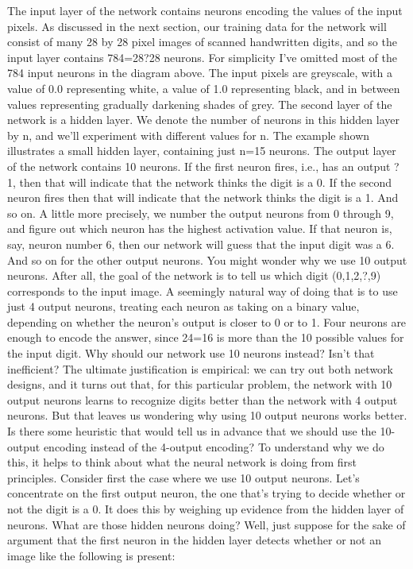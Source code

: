 The input layer of the network contains neurons encoding the values of the input pixels. As discussed in the next section, our training data for the network will consist of many 28 by 28 pixel images of scanned handwritten digits, and so the input layer contains 784=28?28 neurons. For simplicity I've omitted most of the 784 input neurons in the diagram above. The input pixels are greyscale, with a value of 0.0 representing white, a value of 1.0 representing black, and in between values representing gradually darkening shades of grey.
The second layer of the network is a hidden layer. We denote the number of neurons in this hidden layer by n, and we'll experiment with different values for n. The example shown illustrates a small hidden layer, containing just n=15 neurons.
The output layer of the network contains 10 neurons. If the first neuron fires, i.e., has an output ?1, then that will indicate that the network thinks the digit is a 0. If the second neuron fires then that will indicate that the network thinks the digit is a 1. And so on. A little more precisely, we number the output neurons from 0 through 9, and figure out which neuron has the highest activation value. If that neuron is, say, neuron number 6, then our network will guess that the input digit was a 6. And so on for the other output neurons.
You might wonder why we use 10 output neurons. After all, the goal of the network is to tell us which digit (0,1,2,?,9) corresponds to the input image. A seemingly natural way of doing that is to use just 4 output neurons, treating each neuron as taking on a binary value, depending on whether the neuron's output is closer to 0 or to 1. Four neurons are enough to encode the answer, since 24=16 is more than the 10 possible values for the input digit. Why should our network use 10 neurons instead? Isn't that inefficient? The ultimate justification is empirical: we can try out both network designs, and it turns out that, for this particular problem, the network with 10 output neurons learns to recognize digits better than the network with 4 output neurons. But that leaves us wondering why using 10 output neurons works better. Is there some heuristic that would tell us in advance that we should use the 10-output encoding instead of the 4-output encoding?
To understand why we do this, it helps to think about what the neural network is doing from first principles. Consider first the case where we use 10 output neurons. Let's concentrate on the first output neuron, the one that's trying to decide whether or not the digit is a 0. It does this by weighing up evidence from the hidden layer of neurons. What are those hidden neurons doing? Well, just suppose for the sake of argument that the first neuron in the hidden layer detects whether or not an image like the following is present:

